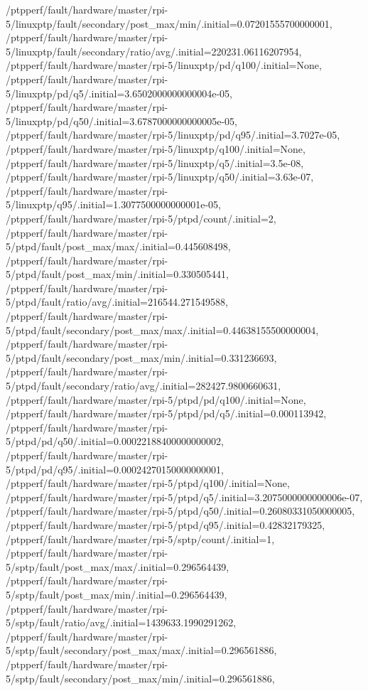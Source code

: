 {    /ptpperf/fault/hardware/master/rpi-5/linuxptp/fault/secondary/post_max/min/.initial=0.07201555700000001,
    /ptpperf/fault/hardware/master/rpi-5/linuxptp/fault/secondary/ratio/avg/.initial=220231.06116207954,
    /ptpperf/fault/hardware/master/rpi-5/linuxptp/pd/q100/.initial=None,
    /ptpperf/fault/hardware/master/rpi-5/linuxptp/pd/q5/.initial=3.6502000000000004e-05,
    /ptpperf/fault/hardware/master/rpi-5/linuxptp/pd/q50/.initial=3.6787000000000005e-05,
    /ptpperf/fault/hardware/master/rpi-5/linuxptp/pd/q95/.initial=3.7027e-05,
    /ptpperf/fault/hardware/master/rpi-5/linuxptp/q100/.initial=None,
    /ptpperf/fault/hardware/master/rpi-5/linuxptp/q5/.initial=3.5e-08,
    /ptpperf/fault/hardware/master/rpi-5/linuxptp/q50/.initial=3.63e-07,
    /ptpperf/fault/hardware/master/rpi-5/linuxptp/q95/.initial=1.3077500000000001e-05,
    /ptpperf/fault/hardware/master/rpi-5/ptpd/count/.initial=2,
    /ptpperf/fault/hardware/master/rpi-5/ptpd/fault/post_max/max/.initial=0.445608498,
    /ptpperf/fault/hardware/master/rpi-5/ptpd/fault/post_max/min/.initial=0.330505441,
    /ptpperf/fault/hardware/master/rpi-5/ptpd/fault/ratio/avg/.initial=216544.271549588,
    /ptpperf/fault/hardware/master/rpi-5/ptpd/fault/secondary/post_max/max/.initial=0.44638155500000004,
    /ptpperf/fault/hardware/master/rpi-5/ptpd/fault/secondary/post_max/min/.initial=0.331236693,
    /ptpperf/fault/hardware/master/rpi-5/ptpd/fault/secondary/ratio/avg/.initial=282427.9800660631,
    /ptpperf/fault/hardware/master/rpi-5/ptpd/pd/q100/.initial=None,
    /ptpperf/fault/hardware/master/rpi-5/ptpd/pd/q5/.initial=0.000113942,
    /ptpperf/fault/hardware/master/rpi-5/ptpd/pd/q50/.initial=0.00022188400000000002,
    /ptpperf/fault/hardware/master/rpi-5/ptpd/pd/q95/.initial=0.00024270150000000001,
    /ptpperf/fault/hardware/master/rpi-5/ptpd/q100/.initial=None,
    /ptpperf/fault/hardware/master/rpi-5/ptpd/q5/.initial=3.2075000000000006e-07,
    /ptpperf/fault/hardware/master/rpi-5/ptpd/q50/.initial=0.26080331050000005,
    /ptpperf/fault/hardware/master/rpi-5/ptpd/q95/.initial=0.42832179325,
    /ptpperf/fault/hardware/master/rpi-5/sptp/count/.initial=1,
    /ptpperf/fault/hardware/master/rpi-5/sptp/fault/post_max/max/.initial=0.296564439,
    /ptpperf/fault/hardware/master/rpi-5/sptp/fault/post_max/min/.initial=0.296564439,
    /ptpperf/fault/hardware/master/rpi-5/sptp/fault/ratio/avg/.initial=1439633.1990291262,
    /ptpperf/fault/hardware/master/rpi-5/sptp/fault/secondary/post_max/max/.initial=0.296561886,
    /ptpperf/fault/hardware/master/rpi-5/sptp/fault/secondary/post_max/min/.initial=0.296561886,
}
